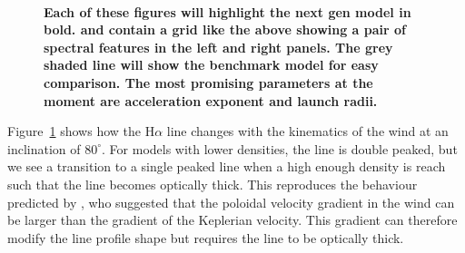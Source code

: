 \documentclass[preprint, a4paper, 11pt]{aastex}
\begin{document}
\begin{figure} %
\mbox{
\quad
{}   
}
\caption{
\bf{Each of these figures will highlight the next gen model in bold.
and contain a grid like the above showing a pair of spectral features in
the left and right panels. The grey shaded line will show the benchmark model
for easy comparison.  
The most promising parameters at the moment are acceleration exponent and launch radii.}
}
\label{halpha}
\end{figure} %

Figure~\ref{halpha} shows how the H$\alpha$ line changes with the kinematics 
of the wind at an inclination of $80^\circ$. For models with lower densities, the
line is double peaked, but we see a transition to a single peaked line when 
a high enough density is reach such that the line becomes optically thick.
This reproduces the behaviour predicted by \cite{MC96}, who suggested that
the poloidal velocity gradient in the wind can be larger than the gradient of 
the Keplerian velocity. This gradient can therefore modify the line profile shape
but requires the line to be optically thick.
\end{document}
